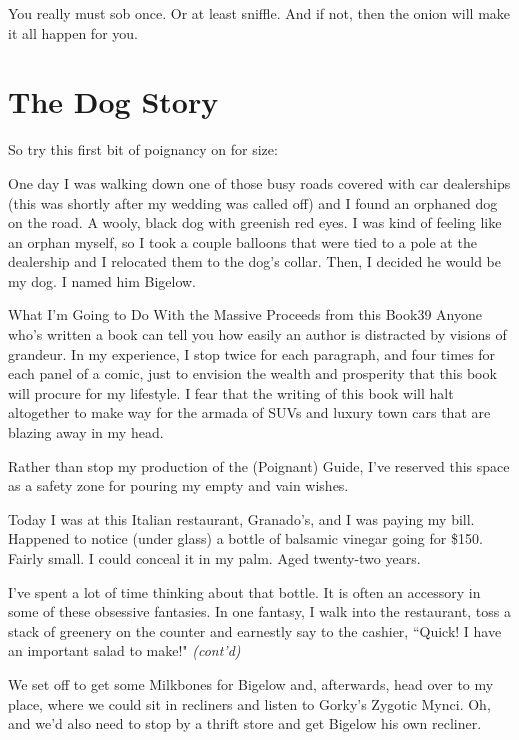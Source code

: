 \documentclass[10pt,twoside]{report}
\begin{document}
You really must sob once.  Or at least sniffle.  And if not, then the
onion will make it all happen for you.


\section{The Dog Story}


So try this first bit of poignancy on for size:

One day I was walking down one of those busy roads covered with car
dealerships (this was shortly after my wedding was called off) and I
found an orphaned dog on the road.  A wooly, black dog with greenish
red eyes.  I was kind of feeling like an orphan myself, so I took a
couple balloons that were tied to a pole at the dealership and I
relocated them to the dog's collar.  Then, I decided he would be my
dog.  I named him Bigelow.

	\begin{sidebar}{What I'm Going to Do With the Massive Proceeds from this Book}{39}
	Anyone who's written a book can tell you how easily an author is distracted by visions of grandeur. In my experience, I stop twice for each paragraph, and four times for each panel of a comic, just to envision the wealth and prosperity that this book will procure for my lifestyle. I fear that the writing of this book will halt altogether to make way for the armada of SUVs and luxury town cars that are blazing away in my head.\vspace{6pt}

	Rather than stop my production of the (Poignant) Guide, I've reserved this space as a safety zone for pouring my empty and vain wishes.\vspace{6pt}

	Today I was at this Italian restaurant, Granado's, and I was paying my bill. Happened to notice (under glass) a bottle of balsamic vinegar going for \$150. Fairly small. I could conceal it in my palm. Aged twenty-two years.\vspace{6pt}

	I've spent a lot of time thinking about that bottle. It is often an accessory in some of these obsessive fantasies. In one fantasy, I walk into the restaurant, toss a stack of greenery on the counter and earnestly say to the cashier, ``Quick! I have an important salad to make!" \textit{(cont'd)}
	\end{sidebar}

We set off to get some Milkbones for Bigelow and, afterwards, head
over to my place, where we could sit in recliners and listen to
Gorky's Zygotic Mynci.  Oh, and we'd also need to stop by a thrift
store and get Bigelow his own recliner.
\end{document}
